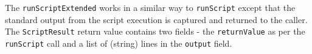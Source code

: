 The \verb+runScriptExtended+ works in a similar way to \verb+runScript+ except that the standard output from the script execution
is captured and returned to the caller. The \verb+ScriptResult+ return value contains two fields - the
\verb+returnValue+ as per the \verb+runScript+ call and a list of (string) lines in the \verb+output+ field.
